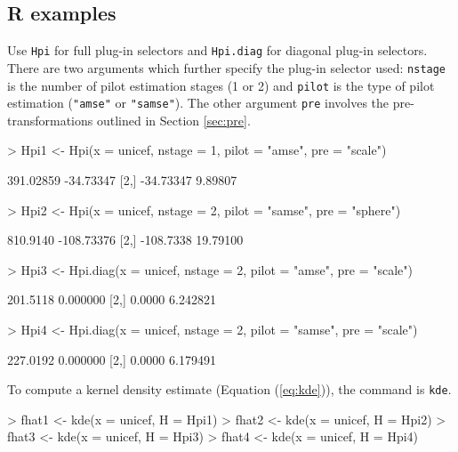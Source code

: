 \documentclass[a4paper,11pt]{article}
\let\code=\texttt
\begin{document}
 
\subsection{R examples}
\label{sec:pi_eg}

Use \texttt{Hpi} for 
full plug-in selectors and \texttt{Hpi.diag} for diagonal plug-in selectors.
There are two arguments which further specify the plug-in selector
used: \texttt{nstage} is the number of pilot estimation stages (1 or 2)
and \texttt{pilot} is the type of pilot estimation (\code{"amse"} 
or \code{"samse"}).
The other argument \texttt{pre} involves the pre-transformations outlined
in Section \ref{sec:pre}. 
\begin{Schunk}
\begin{Sinput}
> Hpi1 <- Hpi(x = unicef, nstage = 1, pilot = "amse", pre = "scale")
\end{Sinput}
\begin{Soutput}
          [,1]      [,2]
[1,] 391.02859 -34.73347
[2,] -34.73347   9.89807
\end{Soutput}
\begin{Sinput}
> Hpi2 <- Hpi(x = unicef, nstage = 2, pilot = "samse", pre = "sphere")
\end{Sinput}
\begin{Soutput}
          [,1]       [,2]
[1,]  810.9140 -108.73376
[2,] -108.7338   19.79100
\end{Soutput}
\begin{Sinput}
> Hpi3 <- Hpi.diag(x = unicef, nstage = 2, pilot = "amse", pre = "scale")
\end{Sinput}
\begin{Soutput}
         [,1]     [,2]
[1,] 201.5118 0.000000
[2,]   0.0000 6.242821
\end{Soutput}
\begin{Sinput}
> Hpi4 <- Hpi.diag(x = unicef, nstage = 2, pilot = "samse", pre = "scale")
\end{Sinput}
\begin{Soutput}
         [,1]     [,2]
[1,] 227.0192 0.000000
[2,]   0.0000 6.179491
\end{Soutput}
\end{Schunk}
To compute a kernel density estimate (Equation (\ref{eq:kde})), the 
command is \texttt{kde}.  
\begin{Schunk}
\begin{Sinput}
> fhat1 <- kde(x = unicef, H = Hpi1)
> fhat2 <- kde(x = unicef, H = Hpi2)
> fhat3 <- kde(x = unicef, H = Hpi3)
> fhat4 <- kde(x = unicef, H = Hpi4)
\end{Sinput}
\end{Schunk}
\end{document}
